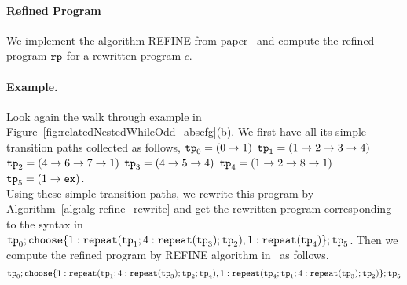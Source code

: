 \paragraph{Refined Program}
We implement the algorithm REFINE from paper~\cite{GulwaniJK09} and compute the 
refined program $\mathtt{rp}$ for a rewritten program $c$.

\paragraph[example]{Example.}
Look again the walk through example in Figure~\ref{fig:relatedNestedWhileOdd_abscfg}(b).
We first have all its simple transition paths collected as follows,
$\mathtt{tp}_0 = (0 \to 1)$
\quad
$\mathtt{tp}_1 = (1 \to 2 \to 3 \to 4)$
\quad
$\mathtt{tp}_2 = (4 \to 6 \to 7 \to 1)$
\quad
$\mathtt{tp}_3 = (4 \to 5 \to 4)$
\quad
$\mathtt{tp}_4 = (1 \to 2 \to 8 \to 1)$
\quad
$\mathtt{tp}_5 = (1 \to \mathtt{ex})$.
\\ 
Using these simple transition paths, we rewrite this program by Algorithm~\ref{alg:alg-refine_rewrite} and get the rewritten program corresponding to the syntax in~\cite{GulwaniJK09}
$ \tpath_0 ; \rpchoose{ 1: \rprepeat(\tpath_1; 4:\rprepeat(\tpath_3); \tpath_2), 
1: \rprepeat(\tpath_4) }; \tpath_5$.
Then we compute the refined program by REFINE algorithm in~\cite{GulwaniJK09} as follows.
\[
    \tpath_0 ; \rpchoose{ 1: \rprepeat(\tpath_1; 4:\rprepeat(\tpath_3); \tpath_2; \tpath_4), 
    1: \rprepeat(\tpath_4; \tpath_1; 4:\rprepeat(\tpath_3); \tpath_2) }; \tpath_5
\]